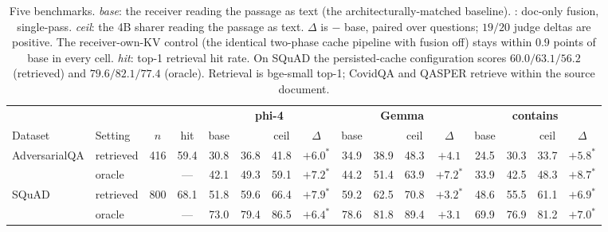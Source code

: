 \begin{table}[t]
\centering\footnotesize
\setlength{\tabcolsep}{2.4pt}
\caption{Five benchmarks. \emph{base}: the receiver reading the passage as text (the
architecturally-matched baseline). \emph{\sys{}}: doc-only fusion, single-pass. \emph{ceil}: the
4B sharer reading the passage as text. $\Delta$ is \sys{} $-$ base, paired over questions;
$19/20$ judge deltas are positive. The receiver-own-KV control (the identical two-phase cache
pipeline with fusion off) stays within $0.9$ points of base in every cell. \emph{hit}: top-1 retrieval hit rate. On SQuAD the
persisted-cache configuration scores $60.0/63.1/56.2$ (retrieved) and $79.6/82.1/77.4$ (oracle).
Retrieval is bge-small top-1; CovidQA and QASPER retrieve within the source document.}
\label{tab:cross}
\begin{tabular}{llcc cccc cccc cccc}
\toprule
& & & & \multicolumn{4}{c}{\textbf{phi-4}} & \multicolumn{4}{c}{\textbf{Gemma}} & \multicolumn{4}{c}{\textbf{contains}} \\
\cmidrule(lr){5-8}\cmidrule(lr){9-12}\cmidrule(lr){13-16}
Dataset & Setting & $n$ & hit
& base & \sys{} & ceil & $\Delta$
& base & \sys{} & ceil & $\Delta$
& base & \sys{} & ceil & $\Delta$ \\
\midrule
\multirow{2}{*}{AdversarialQA} & retrieved & \multirow{2}{*}{416} & 59.4 & 30.8 & 36.8 & 41.8 & $+6.0^{*}$ & 34.9 & 38.9 & 48.3 & $+4.1$ & 24.5 & 30.3 & 33.7 & $+5.8^{*}$ \\
 & oracle &  & --- & 42.1 & 49.3 & 59.1 & $+7.2^{*}$ & 44.2 & 51.4 & 63.9 & $+7.2^{*}$ & 33.9 & 42.5 & 48.3 & $+8.7^{*}$ \\
\midrule
\multirow{2}{*}{SQuAD} & retrieved & \multirow{2}{*}{800} & 68.1 & 51.8 & 59.6 & 66.4 & $+7.9^{*}$ & 59.2 & 62.5 & 70.8 & $+3.2^{*}$ & 48.6 & 55.5 & 61.1 & $+6.9^{*}$ \\
 & oracle &  & --- & 73.0 & 79.4 & 86.5 & $+6.4^{*}$ & 78.6 & 81.8 & 89.4 & $+3.1$ & 69.9 & 76.9 & 81.2 & $+7.0^{*}$ \\

\end{tabular}
\end{table}
